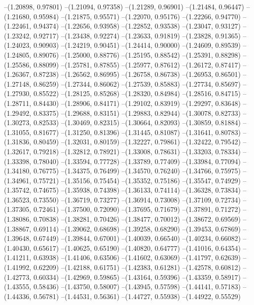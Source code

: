 --(1.20898, 0.97801)
--(1.21094, 0.97358)
--(1.21289, 0.96901)
--(1.21484, 0.96447)
--(1.21680, 0.95984)
--(1.21875, 0.95571)
--(1.22070, 0.95176)
--(1.22266, 0.94770)
--(1.22461, 0.94374)
--(1.22656, 0.93958)
--(1.22852, 0.93538)
--(1.23047, 0.93127)
--(1.23242, 0.92717)
--(1.23438, 0.92274)
--(1.23633, 0.91819)
--(1.23828, 0.91365)
--(1.24023, 0.90903)
--(1.24219, 0.90451)
--(1.24414, 0.90000)
--(1.24609, 0.89539)
--(1.24805, 0.89076)
--(1.25000, 0.88776)
--(1.25195, 0.88542)
--(1.25391, 0.88298)
--(1.25586, 0.88099)
--(1.25781, 0.87855)
--(1.25977, 0.87612)
--(1.26172, 0.87417)
--(1.26367, 0.87238)
--(1.26562, 0.86995)
--(1.26758, 0.86738)
--(1.26953, 0.86501)
--(1.27148, 0.86259)
--(1.27344, 0.86062)
--(1.27539, 0.85883)
--(1.27734, 0.85697)
--(1.27930, 0.85522)
--(1.28125, 0.85268)
--(1.28320, 0.84984)
--(1.28516, 0.84715)
--(1.28711, 0.84430)
--(1.28906, 0.84171)
--(1.29102, 0.83919)
--(1.29297, 0.83648)
--(1.29492, 0.83375)
--(1.29688, 0.83151)
--(1.29883, 0.82944)
--(1.30078, 0.82733)
--(1.30273, 0.82533)
--(1.30469, 0.82315)
--(1.30664, 0.82093)
--(1.30859, 0.81884)
--(1.31055, 0.81677)
--(1.31250, 0.81396)
--(1.31445, 0.81087)
--(1.31641, 0.80783)
--(1.31836, 0.80459)
--(1.32031, 0.80159)
--(1.32227, 0.79861)
--(1.32422, 0.79542)
--(1.32617, 0.79218)
--(1.32812, 0.78921)
--(1.33008, 0.78631)
--(1.33203, 0.78334)
--(1.33398, 0.78040)
--(1.33594, 0.77728)
--(1.33789, 0.77409)
--(1.33984, 0.77094)
--(1.34180, 0.76775)
--(1.34375, 0.76499)
--(1.34570, 0.76240)
--(1.34766, 0.75975)
--(1.34961, 0.75721)
--(1.35156, 0.75454)
--(1.35352, 0.75186)
--(1.35547, 0.74929)
--(1.35742, 0.74675)
--(1.35938, 0.74398)
--(1.36133, 0.74114)
--(1.36328, 0.73834)
--(1.36523, 0.73550)
--(1.36719, 0.73277)
--(1.36914, 0.73008)
--(1.37109, 0.72734)
--(1.37305, 0.72461)
--(1.37500, 0.72090)
--(1.37695, 0.71679)
--(1.37891, 0.71272)
--(1.38086, 0.70838)
--(1.38281, 0.70426)
--(1.38477, 0.70012)
--(1.38672, 0.69569)
--(1.38867, 0.69114)
--(1.39062, 0.68698)
--(1.39258, 0.68290)
--(1.39453, 0.67869)
--(1.39648, 0.67449)
--(1.39844, 0.67001)
--(1.40039, 0.66540)
--(1.40234, 0.66082)
--(1.40430, 0.65617)
--(1.40625, 0.65190)
--(1.40820, 0.64777)
--(1.41016, 0.64354)
--(1.41211, 0.63938)
--(1.41406, 0.63506)
--(1.41602, 0.63069)
--(1.41797, 0.62639)
--(1.41992, 0.62209)
--(1.42188, 0.61751)
--(1.42383, 0.61281)
--(1.42578, 0.60812)
--(1.42773, 0.60334)
--(1.42969, 0.59865)
--(1.43164, 0.59396)
--(1.43359, 0.58917)
--(1.43555, 0.58436)
--(1.43750, 0.58007)
--(1.43945, 0.57598)
--(1.44141, 0.57183)
--(1.44336, 0.56781)
--(1.44531, 0.56361)
--(1.44727, 0.55938)
--(1.44922, 0.55529)
